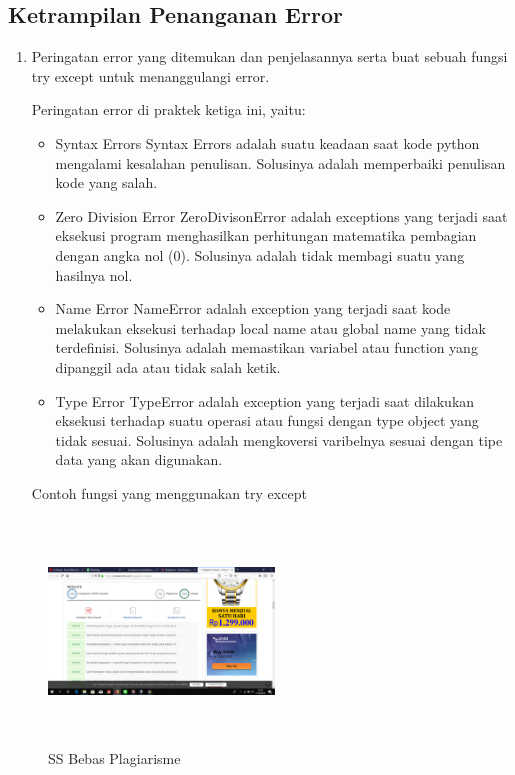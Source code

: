 \subsection{Ketrampilan Penanganan Error}
\begin{enumerate}
	\item Peringatan error yang ditemukan dan penjelasannya serta buat sebuah fungsi try except untuk menanggulangi error.
	
	Peringatan error di praktek ketiga ini, yaitu:
	\begin{itemize}
		\item Syntax Errors
		Syntax Errors adalah suatu keadaan saat kode python mengalami kesalahan penulisan. Solusinya adalah memperbaiki penulisan kode yang salah.
		
		\item Zero Division Error
		ZeroDivisonError adalah exceptions yang terjadi saat eksekusi program menghasilkan perhitungan matematika pembagian dengan angka nol (0). Solusinya adalah tidak membagi suatu yang hasilnya nol.
		
		\item Name Error
		NameError adalah exception yang terjadi saat kode melakukan eksekusi terhadap local name atau global name yang tidak terdefinisi. Solusinya adalah memastikan variabel atau function yang dipanggil ada atau tidak salah ketik.
		
		\item Type Error
		TypeError adalah exception yang terjadi saat dilakukan eksekusi terhadap suatu operasi atau fungsi dengan type object yang tidak sesuai. Solusinya adalah mengkoversi varibelnya sesuai dengan tipe data yang akan digunakan.
	\end{itemize}
	
	Contoh fungsi yang menggunakan try except
	
\end{enumerate}

\begin{figure}[H]
\centering
\includegraphics[width=6cm,height=6cm]{figures/habib.png}
\caption{SS Bebas Plagiarisme}
\label{habib}
\end{figure}
